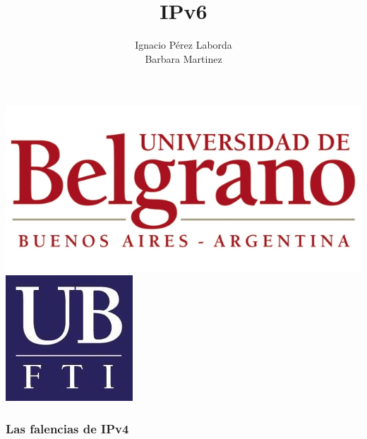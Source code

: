 \documentclass{beamer}
\title[Tecnologia]
{IPv6}
\subtitle{}
\author[Grupo 1] 
{Ignacio P\'erez Laborda\\Barbara Martinez}
\institute[UB--FTI] 
{
  Facultad de Tecnolog\'ia Inform\'atica\\
  Universidad de Belgrano
}
\date[\today]
\begin{document}
\begin{frame}

\includegraphics[height=0.2\textheight]{ub2.jpg} \hspace*{6cm}
\includegraphics[height=0.19\textheight]{FTI.jpg}  
\\[-0.1cm]
\titlepage


\end{frame}

\begin{frame}
\frametitle{Las falencias de IPv4}
\end{frame}
\end{document}
